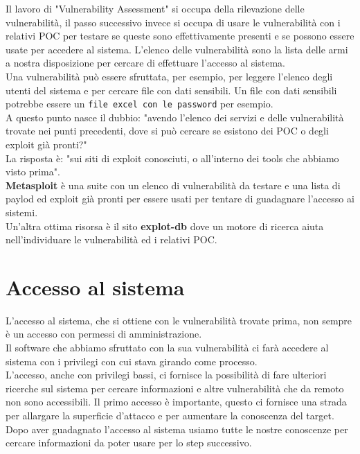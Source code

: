 Il lavoro di "Vulnerability Assessment" si occupa della rilevazione delle vulnerabilità, il passo successivo invece si occupa di usare le vulnerabilità con i relativi POC per testare se queste sono effettivamente presenti e se possono essere usate per accedere al sistema. L'elenco delle vulnerabilità sono la lista delle armi a nostra disposizione per cercare di effettuare l'accesso al sistema.\\ 
Una vulnerabilità può essere sfruttata, per esempio, per leggere l'elenco degli utenti del sistema e per cercare file con dati sensibili. Un file con dati sensibili potrebbe essere un \texttt{file excel con le password} per esempio. \\ 
A questo punto nasce il dubbio: "avendo l'elenco dei servizi e delle vulnerabilità trovate nei punti precedenti, dove si può cercare se esistono dei POC o degli exploit già pronti?" \\
La risposta è: "sui siti di exploit conosciuti, o all'interno dei tools che abbiamo visto prima". \\\textbf{ Metasploit}\cite{metasploit} è una suite con un elenco di vulnerabilità da testare e una lista di  paylod ed exploit già pronti per essere usati per tentare di guadagnare l'accesso ai sistemi. \\
Un'altra ottima risorsa è il sito\textbf{ explot-db}\cite{explot-db} dove un motore di ricerca aiuta nell'individuare le vulnerabilità ed i relativi POC.

\section{ Accesso al sistema }

L'accesso al sistema, che si ottiene con le vulnerabilità trovate prima, non sempre è un accesso con permessi di amministrazione.\\
Il software che abbiamo sfruttato con la sua vulnerabilità ci farà accedere al sistema con i privilegi con cui stava girando come processo.\\
L'accesso, anche con privilegi bassi, ci fornisce la possibilità di fare ulteriori ricerche sul sistema per cercare informazioni e altre vulnerabilità che da remoto non sono accessibili.
Il primo accesso è importante, questo ci fornisce una strada per allargare la superficie d'attacco e per aumentare la conoscenza del target.
Dopo aver guadagnato l'accesso al sistema usiamo tutte le nostre conoscenze per cercare informazioni da poter usare per lo step successivo.


